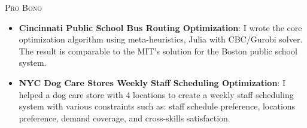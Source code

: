 \documentclass[12pt,a4paper,roman]{moderncv} %
\begin{document}
%

\bigskip

{\textsc{Pro Bono}}{}{}{}{
\begin{itemize}
\item \textbf{Cincinnati Public School Bus Routing Optimization}: I wrote the core optimization algorithm using meta-heuristics, Julia with CBC/Gurobi solver. The result is comparable to the MIT's solution for the Boston public school system.
\item \textbf{NYC Dog Care Stores Weekly Staff Scheduling Optimization}: I helped a dog 
care store with 4 locations to create a weekly staff scheduling system with various 
constraints such as: staff schedule preference, locations preference, demand coverage, and cross-skills satisfaction. 
\end{itemize}


}











\end{document}
